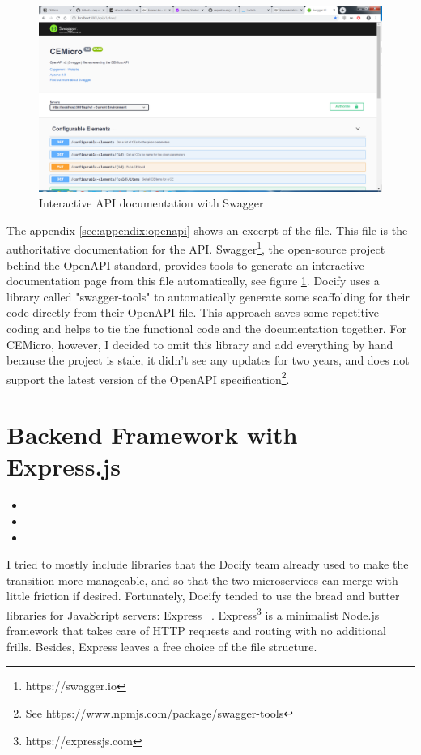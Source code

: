 \begin{figure}[ht]
  \centering
  \includegraphics[width=0.8\linewidth]{assets/swagger-api-docs.png}
  \caption{Interactive API documentation with Swagger}
  \label{fig:api-docs}
\end{figure}

The appendix \ref{sec:appendix:openapi} shows an excerpt of the  file. This file is the authoritative documentation for the API. Swagger\footnote{https://swagger.io}, the open-source project behind the OpenAPI standard, provides tools to generate an interactive documentation page from this file automatically, see figure \ref{fig:api-docs}. Docify uses a library called "swagger-tools" to automatically generate some scaffolding for their code directly from their OpenAPI file. This approach saves some repetitive coding and helps to tie the functional code and the documentation together. For CEMicro, however, I decided to omit this library and add everything by hand because the project is stale, it didn't see any updates for two years, and does not support the latest version of the OpenAPI specification\footnote{See https://www.npmjs.com/package/swagger-tools}.


\section{Backend Framework with Express.js}

\begin{itemize}
  \item {}
  \item {}
  \item {}
\end{itemize}

I tried to mostly include libraries that the Docify team already used to make the transition more manageable, and so that the two microservices can merge with little friction if desired. Fortunately, Docify tended to use the bread and butter libraries for JavaScript servers: Express ~\cite{stateofjs.2019}. Express\footnote{https://expressjs.com} is a minimalist Node.js framework that takes care of HTTP requests and routing with no additional frills. Besides, Express leaves a free choice of the file structure.

